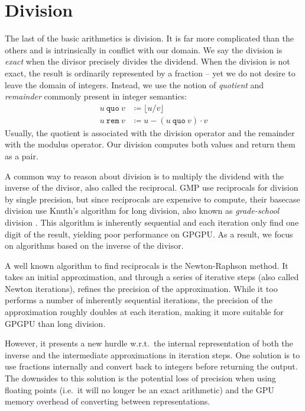 \section{Division}
\label{sec:div}

The last of the basic arithmetics is division. It is far more complicated than
the others and is intrinsically in conflict with our domain. We say the division
is \textit{exact} when the divisor precisely divides the dividend. When the
division is not exact, the result is ordinarily represented by a fraction -- yet
we do not desire to leave the domain of integers. Instead, we use the notion of
\textit{quotient} and \textit{remainder} commonly present in integer semantics:
\begin{align}
  u~\mathtt{quo}~v &\coloneq \lfloor u/v \rfloor\\
  u~ \mathtt{rem}~v &\coloneq u - \left( u~\mathtt{quo}~v \right)\cdot v
\end{align}
Usually, the quotient is associated with the division operator and the remainder
with the modulus operator. Our division computes both values and return them as
a pair.

A common way to reason about division is to multiply the dividend with the
inverse of the divisor, also called the reciprocal. GMP use reciprocals for
division by single precision, but since reciprocals are expensive to compute,
their basecase division use Knuth's algorithm for long division, also known as
\textit{grade-school} division \cite{GMP, knuth97}. This algorithm is inherently
sequential and each iteration only find one digit of the result, yielding poor
performance on GPGPU. As a result, we focus on algorithms based on the inverse
of the divisor.

A well known algorithm to find reciprocals is the Newton-Raphson method. It
takes an initial approximation, and through a series of iterative steps (also
called Newton iterations), refines the precision of the approximation. While it
too performs a number of inherently sequential iterations, the precision of the
approximation roughly doubles at each iteration, making it more suitable for
GPGPU than long division.

However, it presents a new hurdle w.r.t.\ the internal representation of both
the inverse and the intermediate approximations in iteration steps. One solution
is to use fractions internally and convert back to integers before returning the
output. The downsides to this solution is the potential loss of precision when
using floating points (i.e.\ it will no longer be an exact arithmetic) and the
GPU memory overhead of converting between representations.

